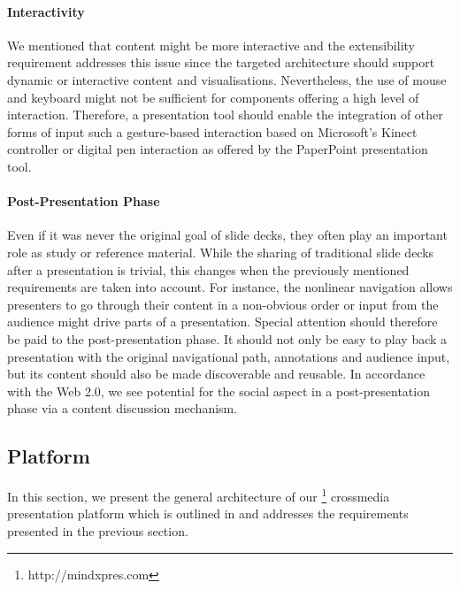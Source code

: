 \documentclass[a4paper,12pt]{report}
\begin{document}
     \paragraph{Interactivity} We mentioned that content might be more
      interactive and the extensibility requirement addresses this issue since
      the targeted architecture should support dynamic or interactive content
      and visualisations. Nevertheless, the use of mouse and keyboard might not
      be sufficient for components offering a high level of interaction.
      Therefore, a presentation tool should enable the integration of other
      forms of input such a gesture-based interaction based on Microsoft's
      Kinect controller or digital pen interaction \citep{signer-2} as offered
      by the PaperPoint \citep{signer-1} presentation tool.

     \paragraph{Post-Presentation Phase} Even if it was never the original goal
      of slide decks, they often play an important role as study or reference
      material. While the sharing of traditional slide decks after a
      presentation is trivial, this changes when the previously mentioned
      requirements are taken into account. For instance, the nonlinear
      navigation allows presenters to go through their content in a non-obvious
      order or input from the audience might drive parts of a presentation.
      Special attention should therefore be paid to the post-presentation
      phase. It should not only be easy to play back a presentation with the
      original navigational path, annotations and audience input, but its
      content should also be made discoverable and reusable. In accordance with
      the Web 2.0, we see potential for the social aspect in a
      post-presentation phase via a content discussion mechanism.

   \subsection{\mxp Platform}
    \label{mxp-platform}

    In this section, we present the general architecture of our
    \mxp\footnote{http://mindxpres.com} crossmedia presentation platform which
    is outlined in  and addresses the requirements
    presented in the previous section.

\end{document}
